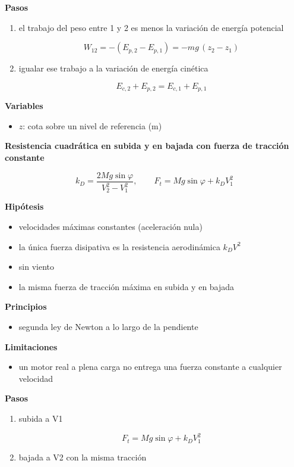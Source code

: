 \documentclass[10pt,openany]{book}
\begin{document}
\begin{tcolorbox}[title={Desarrollos del modelo}, studiumdef, breakable]
\noindent\textbf{Pasos}
\begin{enumerate}
\item
el trabajo del peso entre 1 y 2 es menos la variación de energía potencial

\[
W_{12} = -\left(E_{p,2} - E_{p,1}\right) = -m g\,(z_2 - z_1)
\]
\item
igualar ese trabajo a la variación de energía cinética

\[
E_{c,2} + E_{p,2} = E_{c,1} + E_{p,1}
\]
\end{enumerate}

\noindent\textbf{Variables}
\begin{itemize}
\item $z$: cota sobre un nivel de referencia ($\mathrm{m}$)
\end{itemize}



\noindent\textbf{Resistencia cuadrática en subida y en bajada con fuerza de tracción constante}

\[
k_D = \frac{2Mg\sin\varphi}{V_2^{2} - V_1^{2}},\qquad F_t = Mg\sin\varphi + k_D V_1^{2}
\]

\noindent\textbf{Hipótesis}
\begin{itemize}
\item velocidades máximas constantes (aceleración nula)
\item la única fuerza disipativa es la resistencia aerodinámica \(k_D V^2\)
\item sin viento
\item la misma fuerza de tracción máxima en subida y en bajada
\end{itemize}

\noindent\textbf{Principios}
\begin{itemize}
\item segunda ley de Newton a lo largo de la pendiente
\end{itemize}

\noindent\textbf{Limitaciones}
\begin{itemize}
\item un motor real a plena carga no entrega una fuerza constante a cualquier velocidad
\end{itemize}

\noindent\textbf{Pasos}
\begin{enumerate}
\item
subida a V1

\[
F_t = Mg\sin\varphi + k_D V_1^{2}
\]
\item
bajada a V2 con la misma tracción


\end{enumerate}
\end{tcolorbox}
\end{document}
